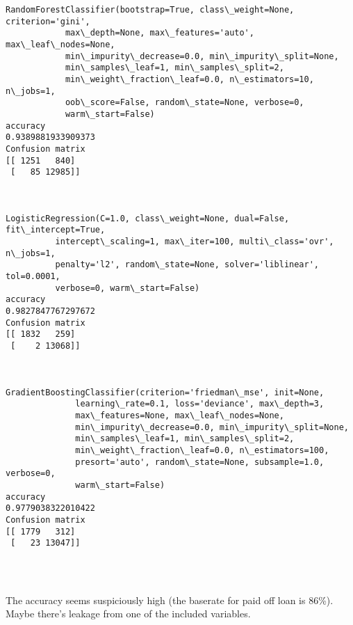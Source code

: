 \documentclass[10pt,notitlepage,onecolumn,aps,pra]{revtex4-1}
\begin{document}
    \begin{Verbatim}[commandchars=\\\{\}]
RandomForestClassifier(bootstrap=True, class\_weight=None, criterion='gini',
            max\_depth=None, max\_features='auto', max\_leaf\_nodes=None,
            min\_impurity\_decrease=0.0, min\_impurity\_split=None,
            min\_samples\_leaf=1, min\_samples\_split=2,
            min\_weight\_fraction\_leaf=0.0, n\_estimators=10, n\_jobs=1,
            oob\_score=False, random\_state=None, verbose=0,
            warm\_start=False)
accuracy
0.9389881933909373
Confusion matrix
[[ 1251   840]
 [   85 12985]]



LogisticRegression(C=1.0, class\_weight=None, dual=False, fit\_intercept=True,
          intercept\_scaling=1, max\_iter=100, multi\_class='ovr', n\_jobs=1,
          penalty='l2', random\_state=None, solver='liblinear', tol=0.0001,
          verbose=0, warm\_start=False)
accuracy
0.9827847767297672
Confusion matrix
[[ 1832   259]
 [    2 13068]]



GradientBoostingClassifier(criterion='friedman\_mse', init=None,
              learning\_rate=0.1, loss='deviance', max\_depth=3,
              max\_features=None, max\_leaf\_nodes=None,
              min\_impurity\_decrease=0.0, min\_impurity\_split=None,
              min\_samples\_leaf=1, min\_samples\_split=2,
              min\_weight\_fraction\_leaf=0.0, n\_estimators=100,
              presort='auto', random\_state=None, subsample=1.0, verbose=0,
              warm\_start=False)
accuracy
0.9779038322010422
Confusion matrix
[[ 1779   312]
 [   23 13047]]




    \end{Verbatim}

    The accuracy seems suspiciously high (the baserate for paid off loan is
86\%). Maybe there's leakage from one of the included variables.
\end{document}
